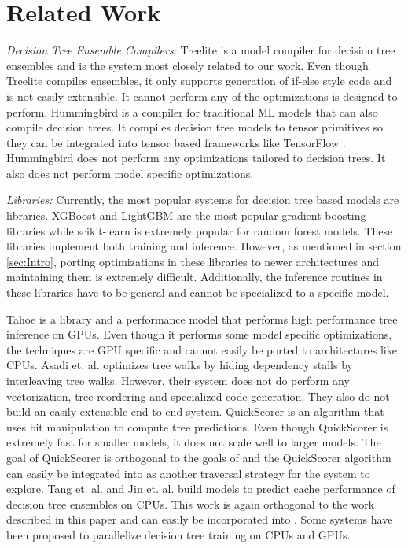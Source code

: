 \section{Related Work}

\emph{Decision Tree Ensemble Compilers:}
Treelite\cite{Treelite} is a model compiler for decision tree ensembles and is the system most
closely related to our work. Even though Treelite compiles ensembles, it only supports 
generation of if-else style code and is not easily extensible. It cannot perform any of the optimizations 
\Treebeard{} is designed to perform. 
Hummingbird\cite{Hummingbird} is a compiler for traditional ML models that can also compile decision trees. 
It compiles decision tree models to tensor primitives so 
they can be integrated into tensor based frameworks like TensorFlow \cite{TensorFlow}.
Hummingbird does not perform any optimizations tailored to decision trees. It 
also does not perform model specific optimizations. 

\emph{Libraries:} Currently, the most popular systems for decision tree based models 
are libraries. XGBoost\cite{XGBoost} and LightGBM\cite{LightGBM} are the most  
popular gradient boosting libraries while scikit-learn\cite{Sklearn} is 
extremely popular for random forest models. These libraries implement both 
training and inference. However, as mentioned in section \ref{sec:Intro}, porting 
optimizations in these libraries to newer architectures and maintaining them is 
extremely difficult. Additionally, the inference routines in these libraries have 
to be general and cannot be specialized to a specific model.

Tahoe\cite{Tahoe} is a library and a performance model that performs high 
performance tree inference on GPUs. Even though it performs some model 
specific optimizations, the techniques are GPU specific and cannot easily 
be ported to architectures like CPUs. Asadi et. al.\cite{VPred} optimizes tree walks
by hiding dependency stalls by interleaving tree walks. However, their system
does not do perform any vectorization, tree reordering and specialized code
generation. They also do not build an easily extensible end-to-end system.
QuickScorer\cite{QuickScorer, QuickScorer1} is an algorithm that uses 
bit manipulation to compute tree predictions. Even though QuickScorer is 
extremely fast for smaller models, it does not scale well to larger 
models\cite{ProbBasedLayout}. The goal of QuickScorer is orthogonal 
to the goals of \Treebeard{} and the QuickScorer algorithm can easily  
be integrated into \Treebeard{} as another traversal strategy for the 
system to explore. Tang et. al.\cite{CacheConscious1} and Jin et. al.\cite{CacheConscious2}
build models to predict cache performance of decision tree ensembles on CPUs.
This work is again orthogonal to the work described in this paper and 
can easily be incorporated into \Treebeard{}. Some systems have been proposed 
to parallelize decision tree training on CPUs and GPUs\cite{Jansson2014gpuRFAG, Nasridinov2013DecisionTC}.


